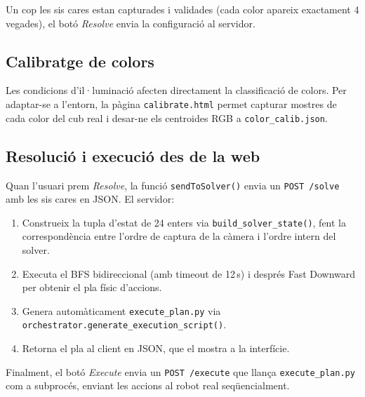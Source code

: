 \documentclass[12pt, a4paper]{article}
\begin{document}
Un cop les sis cares estan capturades i validades (cada color apareix exactament 4 vegades), el botó \textit{Resolve} envia la configuració al servidor.

\subsection{Calibratge de colors}

Les condicions d'il·luminació afecten directament la classificació de colors. Per adaptar-se a l'entorn, la pàgina \texttt{calibrate.html} permet capturar mostres de cada color del cub real i desar-ne els centroides RGB a \texttt{color\_calib.json}.

\subsection{Resolució i execució des de la web}

Quan l'usuari prem \textit{Resolve}, la funció \texttt{sendToSolver()} envia un \texttt{POST /solve} amb les sis cares en JSON. El servidor:

\begin{enumerate}
  \item Construeix la tupla d'estat de 24 enters via \texttt{build\_solver\_state()}, fent la correspondència entre l'ordre de captura de la càmera i l'ordre intern del solver.
  \item Executa el BFS bidireccional (amb timeout de 12\,s) i després Fast Downward per obtenir el pla físic d'accions.
  \item Genera automàticament \texttt{execute\_plan.py} via \texttt{orchestrator.generate\_execution\_script()}.
  \item Retorna el pla al client en JSON, que el mostra a la interfície.
\end{enumerate}

Finalment, el botó \textit{Execute} envia un \texttt{POST /execute} que llança \texttt{execute\_plan.py} com a subprocés, enviant les accions al robot real seqüencialment.


\end{document}
